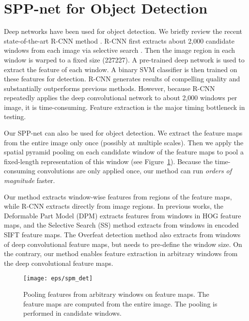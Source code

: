 \documentclass[10pt,journal,cspaper,compsoc]{IEEEtran}
\begin{document}
\section{SPP-net for Object Detection}
\label{sec:detection}

Deep networks have been used for object detection. We briefly review the recent state-of-the-art R-CNN method \cite{Girshick2014}.
R-CNN first extracts about 2,000 candidate windows from each image via selective search \cite{Sande2011}. Then the image region in each window is warped to a fixed size (227227). A pre-trained deep network is used to extract the feature of each window. A binary SVM classifier is then trained on these features for detection. R-CNN generates results of compelling quality and substantially outperforms previous methods. However, because R-CNN repeatedly applies the deep convolutional network to about 2,000 windows per image, it is time-consuming. Feature extraction is the major timing bottleneck in testing.

Our SPP-net can also be used for object detection. We extract the feature maps from the entire image only once (possibly at multiple scales). Then we apply the spatial pyramid pooling on each candidate window of the feature maps to pool a fixed-length representation of this window (see Figure~\ref{fig:spm_det}). Because the time-consuming convolutions are only applied once, our method can run \emph{orders of magnitude} faster.

Our method extracts window-wise features from regions of the feature maps, while R-CNN extracts directly from image regions. In previous works, the Deformable Part Model (DPM) \cite{Felzenszwalb2010} extracts features from windows in HOG \cite{Dalal2005} feature maps, and the Selective Search (SS) method \cite{Sande2011} extracts from windows in encoded SIFT feature maps. The Overfeat detection method \cite{Sermanet2013} also extracts from windows of deep convolutional feature maps, but needs to pre-define the window size. On the contrary, our method enables feature extraction in arbitrary windows from the deep convolutional feature maps.

\begin{figure}[t]
\center
\texttt{[image: eps/spm\_det]}
\caption{Pooling features from arbitrary windows on feature maps. The feature maps are computed from the entire image. The pooling is performed in candidate windows.}
\label{fig:spm_det}
\end{figure}
\end{document}
